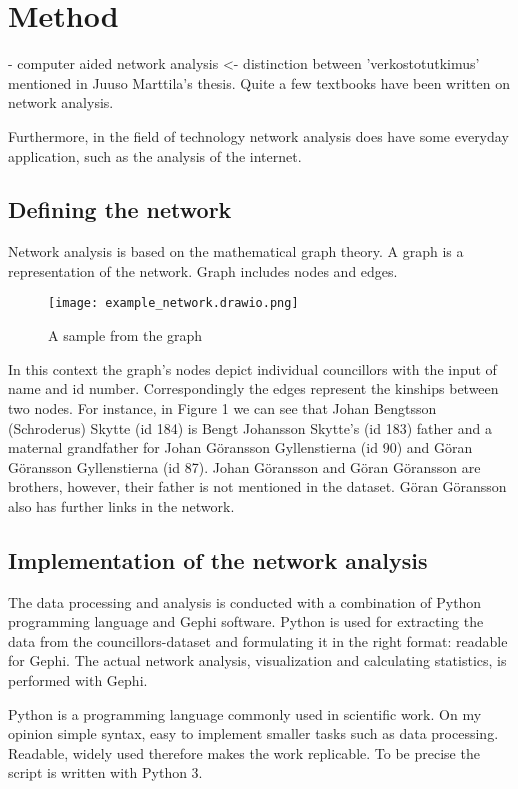 \documentclass[a4paper,12pt]{article}
\begin{document}
\section{Method}
- computer aided network analysis <- distinction between 'verkostotutkimus' mentioned in Juuso Marttila's thesis. 
Quite a few textbooks have been written on network analysis.

Furthermore, in the field of technology network analysis does have some everyday application, such as the analysis of the internet. 

\subsection{Defining the network}
Network analysis is based on the mathematical graph theory. A graph is a representation of the network. Graph includes nodes and edges.

\begin{figure}[h]
	\texttt{[image: example\_network.drawio.png]}
	\centering
	\caption{A sample from the graph} 
	\centering
\end{figure}
In this context the graph's nodes depict individual councillors with the input of name and id number. Correspondingly the edges represent the kinships between two nodes. For instance, in Figure 1 we can see that Johan Bengtsson (Schroderus) Skytte (id 184) is Bengt Johansson Skytte's (id 183) father and a maternal grandfather for Johan Göransson Gyllenstierna (id 90) and Göran Göransson Gyllenstierna (id 87). Johan Göransson and Göran Göransson are brothers, however, their father is not mentioned in the dataset. Göran Göransson also has further links in the network.  

\subsection{Implementation of the network analysis}
The data processing and analysis is conducted with a combination of Python programming language and Gephi software. Python is used for extracting the data from the councillors-dataset and formulating it in the right format: readable for Gephi. The actual network analysis, visualization and calculating statistics, is performed with Gephi. 

Python is a programming language commonly used in scientific work.
On my opinion simple syntax, easy to implement smaller tasks such as data processing. Readable, widely used therefore makes the work replicable. To be precise the script is written with Python 3.
\end{document}
